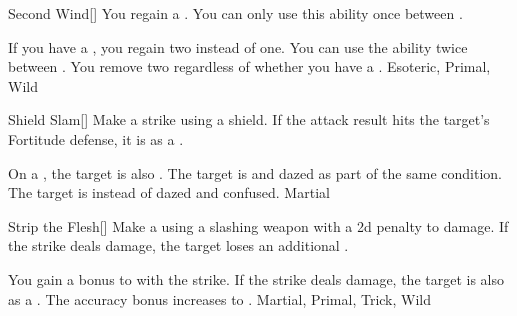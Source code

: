 \lowercase{\hypertarget{maneuver:Second Wind}{}}\label{maneuver:Second Wind}
\hypertarget{maneuver:Second Wind}{}
\begin{freeability}{Second Wind}[]
You regain a .
You can only use this ability once between .

\rankline
{} If you have a , you regain two  instead of one.
 You can use the ability twice between .
 You remove two  regardless of whether you have a .
 Esoteric, Primal, Wild
\end{freeability}
\vspace{0.25em}



\lowercase{\hypertarget{maneuver:Shield Slam}{}}\label{maneuver:Shield Slam}
\hypertarget{maneuver:Shield Slam}{}
\begin{freeability}{Shield Slam}[]
Make a strike using a shield.
If the attack result hits the target's Fortitude defense,
it is  as a .

\rankline
{} On a , the target is also .
 The target is  and dazed as part of the same condition.
 The target is  instead of dazed and confused.
 Martial
\end{freeability}
\vspace{0.25em}



\lowercase{\hypertarget{maneuver:Strip the Flesh}{}}\label{maneuver:Strip the Flesh}
\hypertarget{maneuver:Strip the Flesh}{}
\begin{freeability}{Strip the Flesh}[]
Make a  using a slashing weapon with a \minus2d penalty to damage.
If the strike deals damage, the target loses an additional .

\rankline
{} You gain a  bonus to  with the strike.
 If the strike deals damage, the target is also  as a .
 The accuracy bonus increases to .
 Martial, Primal, Trick, Wild
\end{freeability}
\vspace{0.25em}



